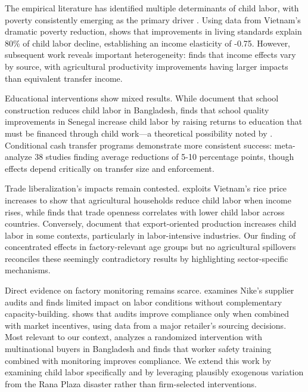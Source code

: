 \documentclass[12pt]{article}
\begin{document}
The empirical literature has identified multiple determinants of child labor, with poverty consistently emerging as the primary driver \cite{edmonds2005child, edmonds2015child}. Using data from Vietnam's dramatic poverty reduction, \cite{edmonds2005does} shows that improvements in living standards explain 80\% of child labor decline, establishing an income elasticity of -0.75. However, subsequent work reveals important heterogeneity: \citet{de2017child} finds that income effects vary by source, with agricultural productivity improvements having larger impacts than equivalent transfer income.

Educational interventions show mixed results. While \cite{ravallion2000wealth} document that school construction reduces child labor in Bangladesh, \citet{dumas2012does} finds that school quality improvements in Senegal increase child labor by raising returns to education that must be financed through child work—a theoretical possibility noted by \citet{rogers2014does}. Conditional cash transfer programs demonstrate more consistent success: \citet{dehoop2014cash} meta-analyze 38 studies finding average reductions of 5-10 percentage points, though effects depend critically on transfer size and enforcement.

Trade liberalization's impacts remain contested. \citet{edmonds2010trade} exploits Vietnam's rice price increases to show that agricultural households reduce child labor when income rises, while \citet{neumayer2005trade} finds that trade openness correlates with lower child labor across countries. Conversely, \citet{cigno2002child} document that export-oriented production increases child labor in some contexts, particularly in labor-intensive industries. Our finding of concentrated effects in factory-relevant age groups but no agricultural spillovers reconciles these seemingly contradictory results by highlighting sector-specific mechanisms.

Direct evidence on factory monitoring remains scarce. \citet{locke2007does} examines Nike's supplier audits and finds limited impact on labor conditions without complementary capacity-building. \citet{distelhorst2017production} shows that audits improve compliance only when combined with market incentives, using data from a major retailer's sourcing decisions. Most relevant to our context, \citet{boudreau2019firms} analyzes a randomized intervention with multinational buyers in Bangladesh and finds that worker safety training combined with monitoring improves compliance. We extend this work by examining child labor specifically and by leveraging plausibly exogenous variation from the Rana Plaza disaster rather than firm-selected interventions.
\end{document}
